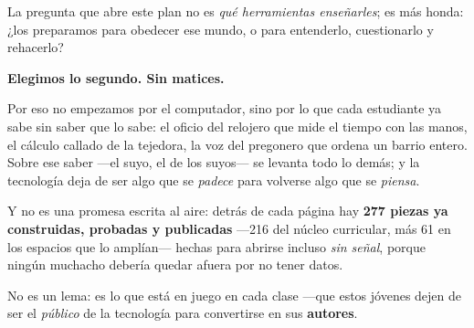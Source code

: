 \documentclass[12pt, a4paper]{article}
\begin{document}
\vfill

\noindent\begin{minipage}{0.93\linewidth}\setlength{\parskip}{10pt}\normalsize\color{black!82}
La pregunta que abre este plan no es \emph{qué herramientas enseñarles}; es más
honda: ¿los preparamos para obedecer ese mundo, o para entenderlo, cuestionarlo y
rehacerlo?

{\large\color{vinoInst}\bfseries Elegimos lo segundo. Sin matices.}

Por eso no empezamos por el computador, sino por lo que cada estudiante ya sabe sin
saber que lo sabe: el oficio del relojero que mide el tiempo con las manos, el
cálculo callado de la tejedora, la voz del pregonero que ordena un barrio entero.
Sobre ese saber —el suyo, el de los suyos— se levanta todo lo demás; y la
tecnología deja de ser algo que se \emph{padece} para volverse algo que se
\emph{piensa}.

Y no es una promesa escrita al aire: detrás de cada página hay \textbf{\color{vinoInst}277
piezas ya construidas, probadas y publicadas} —216 del núcleo curricular, más 61
en los espacios que lo amplían— hechas para abrirse incluso \emph{sin señal},
porque ningún muchacho debería quedar afuera por no tener datos.
\end{minipage}

\vfill

\noindent{\color{dorado}\rule{2.6cm}{2.5pt}}

\vspace{0.45cm}

\vspace{0.5cm}
\noindent\begin{minipage}{0.86\linewidth}\raggedright
{\large\color{black!75}No es un lema: es lo que está en juego en cada clase —que
estos jóvenes dejen de ser el \emph{público} de la tecnología para convertirse en
sus \textbf{\color{vinoInst}autores}.}
\end{minipage}

\vspace*{2cm}
\newpage
\setcounter{tocdepth}{2}
\tableofcontents
\newpage

\thispagestyle{empty}
\vspace*{0.5cm}
\end{document}
